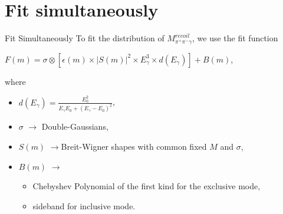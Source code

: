 \documentclass{beamer}
\begin{document}
\section{Fit simultaneously}
\begin{frame}{Fit Simultaneously}
    To fit the distribution of $M^{recoil}_{\pi^+\pi^-\gamma}$, we use the fit function\\
    \begin{center}
            $F(m) = \sigma\otimes[\epsilon(m)\times|S(m)|^2\times E^3_{\gamma}\times d(E_{\gamma})] + B(m)$,
    \end{center}
    where
    \begin{itemize}
        \item $d(E_{\gamma}) = \frac{E^2_0}{E_{\gamma}E_0 + ( E_{\gamma}-E_0 )^2}$,\\
        \item $\sigma$ $\rightarrow$ Double-Gaussians,
        \item $S(m)$ $\rightarrow $Breit-Wigner shapes with common fixed $M$ and $\sigma$,
        \item $B(m)$ $\rightarrow $
            \begin{itemize}
                \item Chebyshev Polynomial of the first kind for the exclusive mode,
                \item sideband for inclusive mode.
            \end{itemize}
    \end{itemize}
\end{frame}

\end{document}
